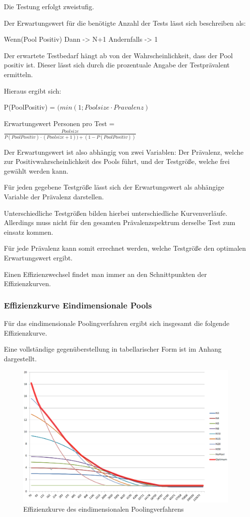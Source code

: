 Die Testung erfolgt zweistufig.

Der Erwartungswert für die benötigte Anzahl der Tests lässt sich beschreiben als:

Wenn(Pool Positiv)
Dann -> N+1
Andernfalls -> 1

Der erwartete Testbedarf hängt ab von der Wahrscheinlichkeit, dass der Pool positiv ist.
Dieser lässt sich durch die prozentuale Angabe der Testprävalent ermitteln.

Hieraus ergibt sich:

P(PoolPositiv) = $(min\left(1;Poolsize\cdot Pravalenz\right)$

Erwartungswert Personen pro Test =
$\frac{Poolsize}{P(PoolPositiv)\cdot (Poolsize + 1)) + (1 - P(PoolPositiv))}$

Der Erwartungswert ist also abhängig von zwei Variablen: Der Prävalenz, welche zur Positivwahrscheinlichkeit des Pools führt, und der Testgröße, welche frei gewählt werden kann.

Für jeden gegebene Testgröße lässt sich der Erwartungswert als abhängige Variable der Prävalenz darstellen.

Unterschiedliche Testgrößen bilden hierbei unterschiedliche Kurvenverläufe.
Allerdings muss nicht für den gesamten Prävalenzspektrum derselbe Test zum einsatz kommen.

Für jede Prävalenz kann somit errechnet werden, welche Testgröße den optimalen Erwartungswert ergibt.

Einen Effizienzwechsel findet man immer an den Schnittpunkten der Effizienzkurven.



\cleardoublepage
\subsubsection{Effizienzkurve Eindimensionale Pools}
Für das eindimensionale Poolingverfahren ergibt sich insgesamt die folgende Effizienzkurve.

Eine vollständige gegenüberstellung in tabellarischer Form ist im Anhang dargestellt.
\begin{figure}[h]
	\centering
	\includegraphics[height=.6\textwidth]{img/1D_Pool-EffKurve}
	\caption{Effizienzkurve des eindimensionalen Poolingverfahrens\footnotemark}
\end{figure}

